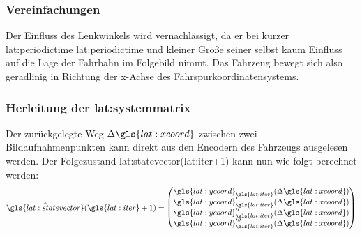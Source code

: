 \subsubsection{Vereinfachungen}
Der Einfluss des Lenkwinkels wird vernachlässigt, da er bei kurzer \glsdesc{lat:periodictime} \gls{lat:periodictime} und kleiner Größe seiner selbst kaum Einfluss auf die Lage der Fahrbahn im Folgebild nimmt. Das Fahrzeug bewegt sich also geradlinig in Richtung der x-Achse des Fahrspurkoordinatensystems. 

\subsubsection{Herleitung der \glsdesc{lat:systemmatrix}}
Der zurückgelegte Weg \begin{math} \Delta \gls{lat:xcoord} \end{math} zwischen zwei Bildaufnahmenpunkten kann direkt aus den Encodern des Fahrzeugs ausgelesen werden. Der Folgezustand  \gls{lat:statevector}(\gls{lat:iter}+1) kann nun wie folgt berechnet werden:
\begin{equation}
\label{eq:nextstatemapping}
\hat{\gls{lat:statevector}}(\gls{lat:iter}+1) =
\begin{pmatrix}
\gls{lat:ycoord}_{\gls{lat:iter}}(\Delta \gls{lat:xcoord}) \\
\gls{lat:ycoord}_{\gls{lat:iter}}^\prime(\Delta \gls{lat:xcoord}) \\
\gls{lat:ycoord}_{\gls{lat:iter}}^{\prime\prime}(\Delta \gls{lat:xcoord}) \\
\gls{lat:ycoord}_{\gls{lat:iter}}^{\prime\prime\prime}(\Delta \gls{lat:xcoord}) \\
\end{pmatrix}
\end{equation}

